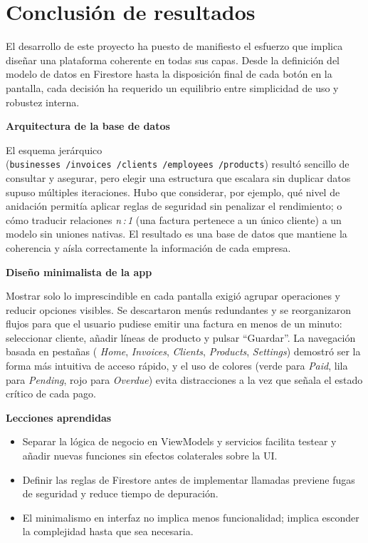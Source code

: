 \section{Conclusión de resultados}

\begin{large}

El desarrollo de este proyecto ha puesto de manifiesto el esfuerzo que implica diseñar una plataforma coherente en todas sus capas. Desde la definición del modelo de datos en Firestore hasta la disposición final de cada botón en la pantalla, cada decisión ha requerido un equilibrio entre simplicidad de uso y robustez interna.

\textbf{Arquitectura de la base de datos}

El esquema jerárquico (\texttt{businesses\,/invoices\,/clients\,/employees\,/products}) resultó sencillo de consultar y asegurar, pero elegir una estructura que escalara sin duplicar datos supuso múltiples iteraciones. Hubo que considerar, por ejemplo, qué nivel de anidación permitía aplicar reglas de seguridad sin penalizar el rendimiento; o cómo traducir relaciones \emph{n\,:\,1} (una factura pertenece a un único cliente) a un modelo sin uniones nativas. El resultado es una base de datos que mantiene la coherencia y aísla correctamente la información de cada empresa.

\textbf{Diseño minimalista de la app}

Mostrar solo lo imprescindible en cada pantalla exigió agrupar operaciones y reducir opciones visibles. Se descartaron menús redundantes y se reorganizaron flujos para que el usuario pudiese emitir una factura en menos de un minuto: seleccionar cliente, añadir líneas de producto y pulsar “Guardar”. La navegación basada en pestañas (
\textit{Home}, \textit{Invoices}, \textit{Clients}, \textit{Products}, \textit{Settings}) demostró ser la forma más intuitiva de acceso rápido, y el uso de colores (verde para \textit{Paid}, lila para \textit{Pending}, rojo para \textit{Overdue}) evita distracciones a la vez que señala el estado crítico de cada pago.

\textbf{Lecciones aprendidas}

\begin{itemize}
  \item Separar la lógica de negocio en ViewModels y servicios facilita testear y añadir nuevas funciones sin efectos colaterales sobre la UI.
  \item Definir las reglas de Firestore antes de implementar llamadas previene fugas de seguridad y reduce tiempo de depuración.
  \item El minimalismo en interfaz no implica menos funcionalidad; implica esconder la complejidad hasta que sea necesaria.
\end{itemize}


\end{large}

